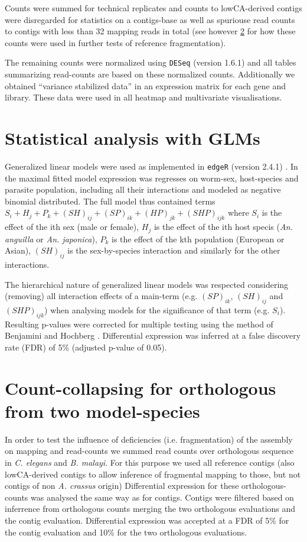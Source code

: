 Counts were summed for technical replicates and counts to
lowCA-derived contigs were disregarded for statistics on a
contigs-base as well as spuriouse read counts to contigs with less
than 32 mapping reads in total (see however \ref{collapse} for how
these counts were used in further tests of reference fragmentation).

The remaining counts were normalized using \texttt{DESeq} (version
1.6.1) and all tables summarizing read-counts are based on these
normalized counts. Additionally we obtained ``variance stabilized
data'' in an expression matrix for each gene and library. These data
were used in all heatmap and multivariate visualisations.

\section{Statistical analysis with GLMs}

Generalized linear models were used as implemented in \texttt{edgeR}
(version 2.4.1) \cite{pmid19910308}. In the maximal fitted model
expression was regresses on worm-sex, host-species and parasite
population, including all their interactions and modeled as negative
binomial distributed. The full model thus contained terms $ S_i + H_j
+ P_k + (SH)_{ij} + (SP)_{ik} + (HP)_{jk} + (SHP)_{ijk}$ where $S_i$
is the effect of the ith sex (male or female), $H_j$ is the effect of
the ith host specis (\textit{An. anguilla} or \textit{An. japonica}),
$P_k$ is the effect of the kth population (European or Asian),
$(SH)_{ij}$ is the sex-by-species interaction and similarly for the
other interactions.

The hierarchical nature of generalized linear models was respected
considering (removing) all interaction effects of a main-term
(e.g. $(SP)_{ik}$, $(SH)_{ij}$ and $(SHP)_{ijk}$) when analysing
models for the significance of that term (e.g. $S_i$). Resulting
p-values were corrected for multiple testing using the method of
Benjamini and Hochberg \cite{benjamini1995controlling}. Differential
expression was inferred at a false discovery rate (FDR) of 5\%
(adjusted p-value of 0.05).

\section{Count-collapsing for orthologous from two model-species}
\label{collapse}

In order to test the influence of deficiencies (i.e. fragmentation) of
the assembly on mapping and read-counts we summed read counts over
orthologous sequence in \textit{C. elegans} and
\textit{B. malayi}. For this purpose we used all reference contigs
(also lowCA-derived contigs to allow inference of fragmental mapping
to those, but not contigs of non \textit{A. crassus} origin)
Differential expression for these orthologous-counts was analysed the
same way as for contigs. Contigs were filtered based on inferrence
from orthologous counts merging the two orthologous evaluations and
the contig evaluation. Differential expression was accepted at a FDR
of 5\% for the contig evaluation and 10\% for the two orthologous
evaluations.

